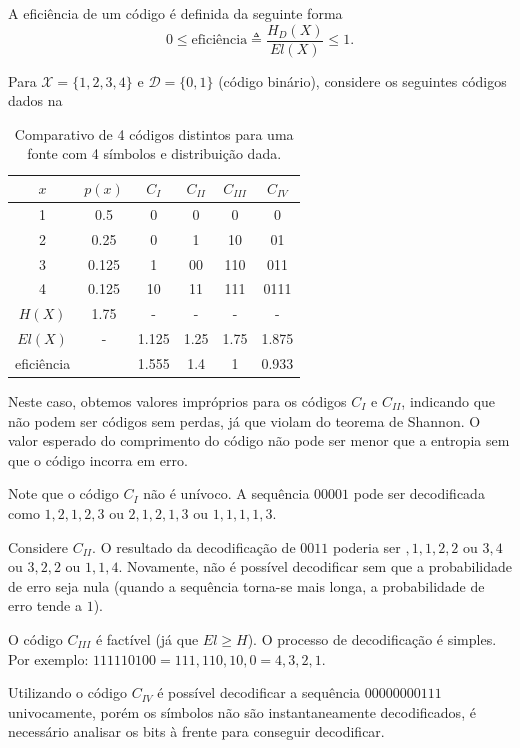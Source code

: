 \begin{definition}
  A eficiência de um código é definida da seguinte forma
    \begin{equation}
      0 \leq \text{eficiência} \triangleq \frac{H_D(X)}{E l(X)} \leq 1 .
    \end{equation}
\end{definition}

\begin{example}
  Para $\mathcal{X} = \{1,2,3,4\}$ e $\mathcal{D}=\{0,1\}$ (código binário), considere os seguintes códigos
  dados na 
  \begin{table}[h]
    \centering
    \caption{Comparativo de 4 códigos distintos para uma fonte com 4 símbolos e distribuição dada.}\label{tb:excode3}
    \begin{tabular}{c|c|c|c|c|c}
    $x$           & $p(x)$& $C_I$ & $C_{II}$ & $C_{III}$ & $C_{IV}$ \\ \hline
    1             & 0.5   &  0    &   0   &  0            &   0   \\
    2             & 0.25  &  0    &   1   & 10            &  01   \\
    3             & 0.125 &  1    &  00   & 110           & 011   \\
    4             & 0.125 & 10    &  11   & 111           & 0111  \\
    $H(X)$        & 1.75  &  -    &  -    &  -            &  -    \\
    $El(X)$       &  -    & 1.125 & 1.25  &  1.75         & 1.875 \\
    eficiência    &       & 1.555 & 1.4   & 1             & 0.933 
    \end{tabular}
  \end{table}
  Neste caso, obtemos valores impróprios para os códigos $C_I$ e $C_{II}$,
  indicando que não podem ser códigos sem perdas, já que violam do teorema de Shannon.
  O valor esperado do comprimento do código não pode ser menor que a entropia sem que o código incorra em erro.

  Note que o código $C_I$ não é unívoco. A sequência $00001$ pode ser decodificada como
  $1,2,1,2,3$ ou $2,1,2,1,3$ ou $1,1,1,1,3$.

  Considere $C_{II}$. O resultado da decodificação de $0011$ poderia ser $,1,1,2,2$ ou $3,4$ ou $3,2,2$ ou $1,1,4$.
  Novamente, não é possível decodificar sem que a probabilidade de erro seja nula (quando a sequência torna-se mais longa, a probabilidade de erro tende a $1$).

  O código $C_{III}$ é factível (já que $El \geq H$). O processo de decodificação é simples. Por exemplo: $111110100 = 111,110,10,0 = 4,3,2,1$.

  Utilizando o código $C_{IV}$ é possível decodificar a sequência $00000000111$ univocamente, porém os símbolos não são instantaneamente decodificados, é necessário analisar os bits à frente para conseguir decodificar.
\end{example}


